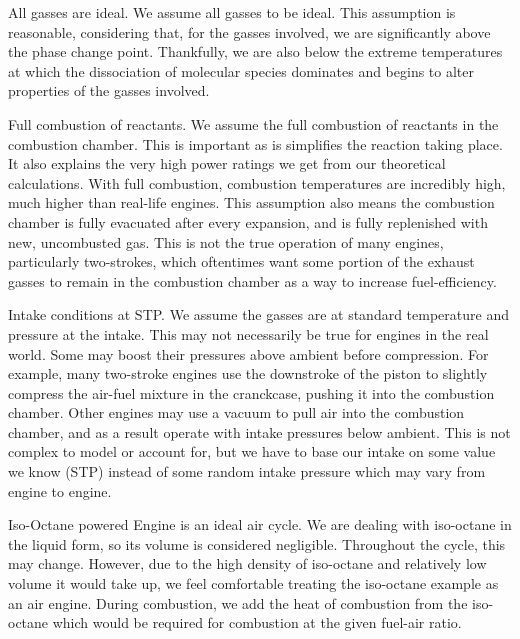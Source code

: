 \documentclass[conf]{new-aiaa}
\begin{document}
All gasses are ideal. We assume all gasses to be ideal. This assumption is reasonable, considering that, for the gasses involved, we are significantly above the phase change point. Thankfully, we are also below the extreme temperatures at which the dissociation of molecular species dominates and begins to alter properties of the gasses involved.

Full combustion of reactants. We assume the full combustion of reactants in the combustion chamber. This is important as is simplifies the reaction taking place. It also explains the very high power ratings we get from our theoretical calculations. With full combustion, combustion temperatures are incredibly high, much higher than real-life engines. This assumption also means the combustion chamber is fully evacuated after every expansion, and is fully replenished with new, uncombusted gas. This is not the true operation of many engines, particularly two-strokes, which oftentimes want some portion of the exhaust gasses to remain in the combustion chamber as a way to increase fuel-efficiency.

 Intake conditions at STP. We assume the gasses are at standard temperature and pressure at the intake. This may not necessarily be true for engines in the real world. Some may boost their pressures above ambient before compression. For example, many two-stroke engines use the downstroke of the piston to slightly compress the air-fuel mixture in the cranckcase, pushing it into the combustion chamber. Other engines may use a vacuum to pull air into the combustion chamber, and as a result operate with intake pressures below ambient. This is not complex to model or account for, but we have to base our intake on some value we know (STP) instead of some random intake pressure which may vary from engine to engine.

Iso-Octane powered Engine is an ideal air cycle. We are dealing with iso-octane in the liquid form, so its volume is considered negligible. Throughout the cycle, this may change. However, due to the high density of iso-octane and relatively low volume it would take up, we feel comfortable treating the iso-octane example as an air engine. During combustion, we add the heat of combustion from the iso-octane which would be required for combustion at the given fuel-air ratio.
\end{document}
